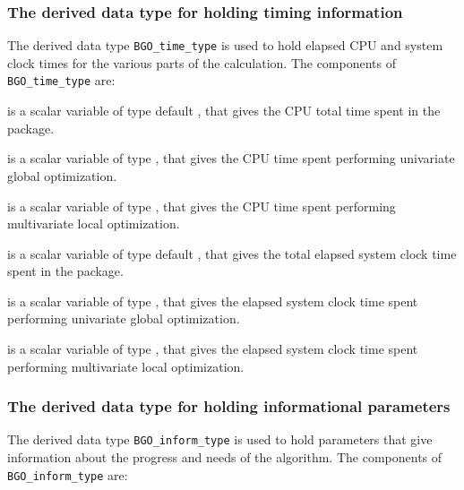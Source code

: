\documentclass{galahad}
\newcommand{\packagename}{BGO}
\begin{document}
\subsubsection{The derived data type for holding timing
 information}\label{typetime}
The derived data type
{\tt \packagename\_time\_type}
is used to hold elapsed CPU and system clock times for the various parts
of the calculation. The components of
{\tt \packagename\_time\_type}
are:
\begin{description}
 is a scalar variable of type default \real, that gives
 the CPU total time spent in the package.

 is a scalar variable of type \realdp, that 
gives the CPU time spent performing univariate global optimization.

 is a scalar variable of type \realdp, that 
gives the CPU time spent performing multivariate local optimization.

 is a scalar variable of type default \real, that gives
 the total elapsed system clock time spent in the package.

 is a scalar variable of type \realdp, 
that gives the elapsed system clock time spent performing univariate global 
optimization.

 is a scalar variable of type \realdp, 
that gives the  elapsed system clock time spent performing multivariate local 
optimization.

\end{description}


\subsubsection{The derived data type for holding informational
 parameters}\label{typeinform}
The derived data type
{\tt \packagename\_inform\_type}
is used to hold parameters that give information about the progress and needs
of the algorithm. The components of
{\tt \packagename\_inform\_type}
are:
\end{document}
